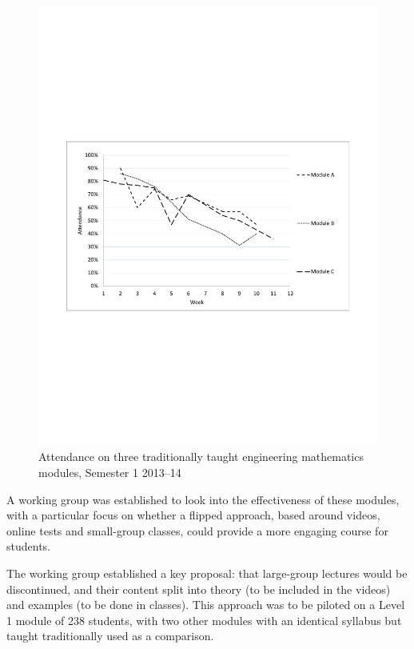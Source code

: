 \documentclass{amsart}
\begin{document}
\begin{center}
\begin{figure}[hbt]
\includegraphics[bb=50 250 562 545,width=1\textwidth]{Figure1.pdf}
\caption{Attendance on three traditionally taught engineering mathematics modules, Semester 1 2013--14}
\end{figure}
\end{center}

A working group was established to look into the effectiveness of these modules, with a particular focus on whether a flipped approach, based around videos, online tests and small-group classes, could provide a more engaging course for students.  

The working group established a key proposal: that large-group lectures would be discontinued, and their content split into theory (to be included in the videos) and examples (to be done in classes).  This approach was to be piloted on a Level 1 module of 238 students, with two other modules with an identical syllabus but taught traditionally used as a comparison.
\end{document}
